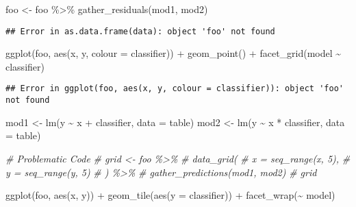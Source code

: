 \documentclass[
]{article}
\newenvironment{Shaded}{\begin{snugshade}}{\end{snugshade}}
\newcommand{\AttributeTok}[1]{\textcolor[rgb]{0.77,0.63,0.00}{#1}}
\newcommand{\CommentTok}[1]{\textcolor[rgb]{0.56,0.35,0.01}{\textit{#1}}}
\newcommand{\FunctionTok}[1]{\textcolor[rgb]{0.00,0.00,0.00}{#1}}
\newcommand{\NormalTok}[1]{#1}
\newcommand{\OtherTok}[1]{\textcolor[rgb]{0.56,0.35,0.01}{#1}}
\newcommand{\SpecialCharTok}[1]{\textcolor[rgb]{0.00,0.00,0.00}{#1}}
\begin{document}
\begin{Shaded}
\begin{Highlighting}[]
\NormalTok{foo }\OtherTok{\textless{}{-}}\NormalTok{ foo }\SpecialCharTok{\%\textgreater{}\%} 
  \FunctionTok{gather\_residuals}\NormalTok{(mod1, mod2)}
\end{Highlighting}
\end{Shaded}

\begin{verbatim}
## Error in as.data.frame(data): object 'foo' not found
\end{verbatim}

\begin{Shaded}
\begin{Highlighting}[]
\FunctionTok{ggplot}\NormalTok{(foo, }\FunctionTok{aes}\NormalTok{(x, y, }\AttributeTok{colour =}\NormalTok{ classifier)) }\SpecialCharTok{+} 
  \FunctionTok{geom\_point}\NormalTok{() }\SpecialCharTok{+} 
  \FunctionTok{facet\_grid}\NormalTok{(model }\SpecialCharTok{\textasciitilde{}}\NormalTok{ classifier)}
\end{Highlighting}
\end{Shaded}

\begin{verbatim}
## Error in ggplot(foo, aes(x, y, colour = classifier)): object 'foo' not found
\end{verbatim}

\begin{Shaded}
\begin{Highlighting}[]
\NormalTok{mod1 }\OtherTok{\textless{}{-}} \FunctionTok{lm}\NormalTok{(y }\SpecialCharTok{\textasciitilde{}}\NormalTok{ x }\SpecialCharTok{+}\NormalTok{ classifier, }\AttributeTok{data =}\NormalTok{ table)}
\NormalTok{mod2 }\OtherTok{\textless{}{-}} \FunctionTok{lm}\NormalTok{(y }\SpecialCharTok{\textasciitilde{}}\NormalTok{ x }\SpecialCharTok{*}\NormalTok{ classifier, }\AttributeTok{data =}\NormalTok{ table)}

\CommentTok{\# Problematic Code}
\CommentTok{\# grid \textless{}{-} foo \%\textgreater{}\% }
\CommentTok{\#   data\_grid(}
\CommentTok{\#     x = seq\_range(x, 5), }
\CommentTok{\#     y = seq\_range(y, 5) }
\CommentTok{\#   ) \%\textgreater{}\% }
\CommentTok{\#   gather\_predictions(mod1, mod2)}
\CommentTok{\# grid}


\FunctionTok{ggplot}\NormalTok{(foo, }\FunctionTok{aes}\NormalTok{(x, y)) }\SpecialCharTok{+} 
  \FunctionTok{geom\_tile}\NormalTok{(}\FunctionTok{aes}\NormalTok{(}\AttributeTok{y =}\NormalTok{ classifier)) }\SpecialCharTok{+} 
  \FunctionTok{facet\_wrap}\NormalTok{(}\SpecialCharTok{\textasciitilde{}}\NormalTok{ model)}
\end{Highlighting}
\end{Shaded}
\end{document}
